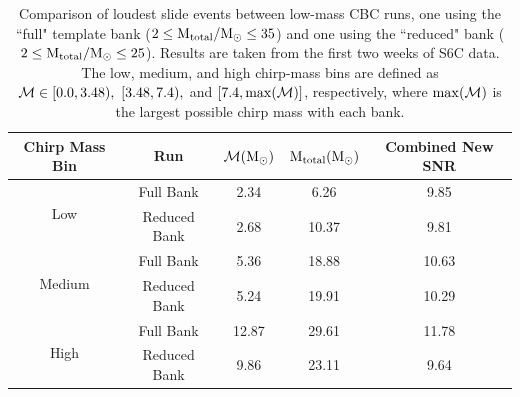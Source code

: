 \begin{table}[p]
\label{tab:smalller_bank_investigation-loudest_slides}
\center
\begin{tabular}{| c | c | c | c | c |}
\hline
Chirp Mass Bin & Run & $\mathcal{M} (\mathrm{M_\odot})$ & $\mathrm{M_{total}} (\mathrm{M_\odot})$ & Combined New \ac{SNR} \\ 
\hline \hline
\multirow{2}{*}{Low} & Full Bank & 2.34 & 6.26 & 9.85 \\
                     & Reduced Bank & 2.68 & 10.37 & 9.81 \\
\hline
\multirow{2}{*}{Medium} & Full Bank & 5.36 & 18.88 & 10.63 \\
                        & Reduced Bank & 5.24 & 19.91 & 10.29 \\
\hline
\multirow{2}{*}{High}   & Full Bank & 12.87 & 29.61 & 11.78 \\
                        & Reduced Bank & 9.86 & 23.11 & 9.64 \\
\hline
\end{tabular}
\caption{Comparison of loudest slide events between low-mass \ac{CBC} runs, one
using the ``full" template bank ($2 \leq \mathrm{M_{total}}/\mathrm{M_\odot} \leq 35$) and one using
the ``reduced" bank ($2 \leq \mathrm{M_{total}}/\mathrm{M_\odot} \leq 25$). Results are taken from
the first two weeks of S6C data. The low, medium, and high chirp-mass bins are
defined as $\mathcal{M} \in [0.0, 3.48), ~[3.48, 7.4),$ and $[7.4, \max(\mathcal{M})]$,
respectively, where $\max(\mathcal{M})$ is the largest possible chirp mass with
each bank.}
\end{table}

